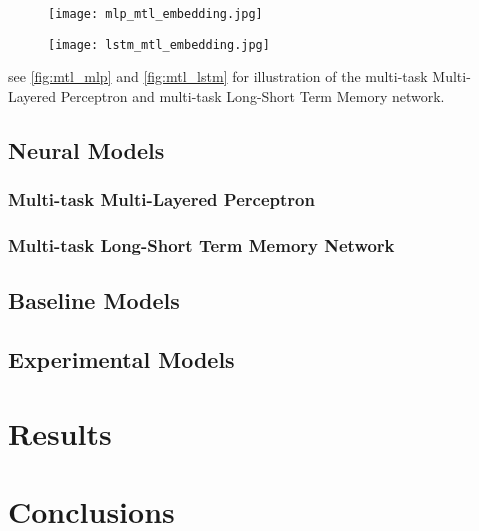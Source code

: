 \begin{figure}
  \centering
  \texttt{[image: mlp\_mtl\_embedding.jpg]}
  \label{fig:mtl_embedding}
\end{figure}

\begin{figure}
  \centering
  \texttt{[image: lstm\_mtl\_embedding.jpg]}
  \label{fig:mtl_embedding}
\end{figure}

see \autoref{fig:mtl_mlp} and \autoref{fig:mtl_lstm} for illustration of the multi-task Multi-Layered Perceptron and multi-task Long-Short Term Memory network.

\subsection{Neural Models}

\subsubsection{Multi-task Multi-Layered Perceptron}

\subsubsection{Multi-task Long-Short Term Memory Network}

\subsection{Baseline Models}

\subsection{Experimental Models}




\section{Results}


\section{Conclusions}

